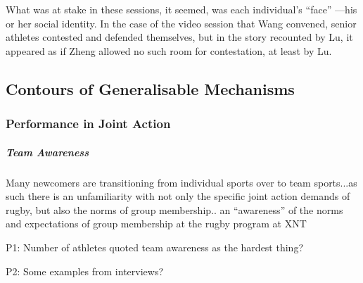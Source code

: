 What was at stake in these sessions, it seemed, was each individual's ``face'' ---his or her social identity.  In the case of the video session that Wang convened, senior athletes contested and defended themselves, but in the story recounted by Lu, it appeared as if Zheng allowed no such room for contestation, at least by Lu.

































    \subsection{Contours of Generalisable Mechanisms}

      \subsubsection{Performance in Joint Action}



            \subparagraph{Team Awareness}

            Many newcomers are transitioning from individual sports over to team sports...as such there is an unfamiliarity with not only the specific joint action demands of rugby, but also the norms of group membership.. an ``awareness'' of the norms and expectations of group membership at the rugby program at XNT

          P1: %
          Number of athletes quoted team awareness as the hardest thing?

          P2: %
          Some examples from interviews?



